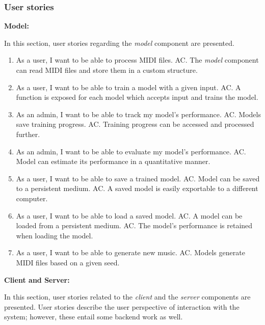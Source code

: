 \documentclass[a4paper, 11pt, twoside]{report}
\theoremstyle{definition}
\begin{document}
\subsubsection{User stories}

\newcommand{\AC}{\subitem AC. }

\textbf{\large Model:}

In this section, user stories regarding the \textit{model} component are presented.

\begin{enumerate}
    \item
          As a user, I want to be able to process MIDI files.
          \AC The \textit{model} component can read MIDI files and store them in a custom structure.

    \item
          As a user, I want to be able to train a model with a given input.
          \AC A function is exposed for each model which accepts input and trains the model.

    \item
          As an admin, I want to be able to track my model's performance.
          \AC Models save training progress.
          \AC Training progress can be accessed and processed further.

    \item
          As an admin, I want to be able to evaluate my model's performance.
          \AC Model can estimate its performance in a quantitative manner.

    \item
          As a user, I want to be able to save a trained model.
          \AC Model can be saved to a persistent medium.
          \AC A saved model is easily exportable to a different computer.

    \item
          As a user, I want to be able to load a saved model.
          \AC A model can be loaded from a persistent medium.
          \AC The model's performance is retained when loading the model.

    \item
          As a user, I want to be able to generate new music.
          \AC Models generate MIDI files based on a given seed.
\end{enumerate} \par

\textbf{\large Client and Server:}

In this section, user stories related to the \textit{client} and the \textit{server} components are presented. User stories describe the user perspective of interaction with the system; however, these entail some backend work as well.
\end{document}
